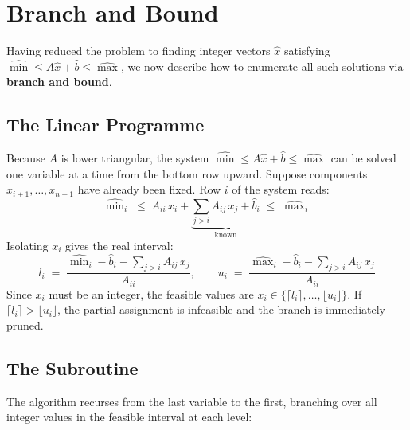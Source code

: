 \documentclass[11pt]{article}
\theoremstyle{plain}
\theoremstyle{definition}
\begin{document}
\section{Branch and Bound}

Having reduced the problem to finding integer vectors $\hat{x}$ satisfying
$\widehat{\min} \leq A\hat{x} + \hat{b} \leq \widehat{\max}$,
we now describe how to enumerate all such solutions via \textbf{branch and bound}.

\subsection{The Linear Programme}

Because $A$ is lower triangular, the system $\widehat{\min} \leq A\hat{x} + \hat{b} \leq \widehat{\max}$
can be solved one variable at a time from the bottom row upward. Suppose components
$x_{i+1}, \ldots, x_{n-1}$ have already been fixed. Row $i$ of the system reads:
\[
    \widehat{\min}_i \;\leq\; A_{ii}\, x_i + \underbrace{\sum_{j>i} A_{ij}\, x_j + \hat{b}_i}_{\text{known}} \;\leq\; \widehat{\max}_i
\]
Isolating $x_i$ gives the real interval:
\[
    l_i \;=\; \frac{\widehat{\min}_i - \hat{b}_i - \sum_{j>i} A_{ij}\,x_j}{A_{ii}}, \qquad
    u_i \;=\; \frac{\widehat{\max}_i - \hat{b}_i - \sum_{j>i} A_{ij}\,x_j}{A_{ii}}
\]
Since $x_i$ must be an integer, the feasible values are
$x_i \in \{\lceil l_i \rceil, \ldots, \lfloor u_i \rfloor\}$.
If $\lceil l_i \rceil > \lfloor u_i \rfloor$, the partial assignment is infeasible and
the branch is immediately pruned.

\subsection{The Subroutine}

The algorithm recurses from the last variable to the first, branching over all integer values
in the feasible interval at each level:
\end{document}
